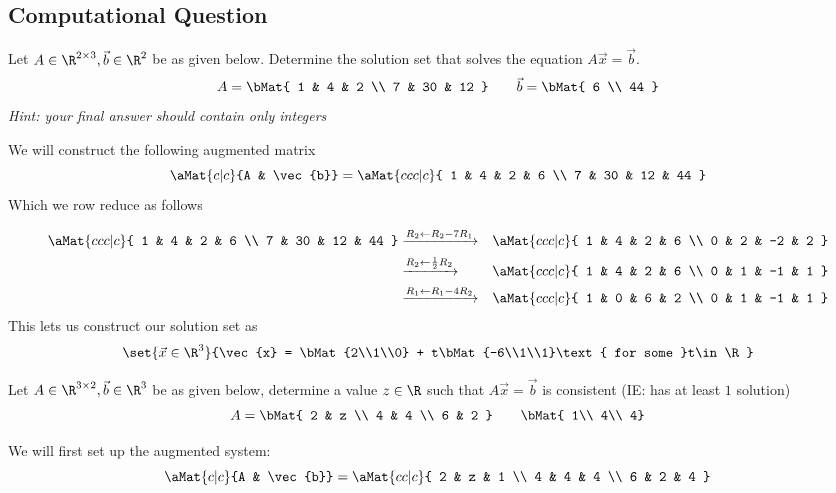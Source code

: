 \documentclass[12pt,addpoints,answers]{exam}
\begin{document}
\begin{questions}
    \section*{Computational Question}
    \question[15]
    Let $A\in\R^{2\times 3},\vec{b}\in\R^2$ be as given below. Determine the solution set that
    solves the equation $A\vec{x} = \vec{b}$.
    \[
        A = \bMat{
        1 & 4 & 2 \\
        7 & 30 & 12
        } \qquad \vec{b} = \bMat{ 6 \\ 44 }
    \]
    \emph{Hint: your final answer should contain only integers}
    \begin{solution}
        We will construct the following augmented matrix
        \[
            \aMat{c|c}{A & \vec{b}} = \aMat{ccc|c}{
                1 & 4 & 2 & 6 \\
                7 & 30 & 12 & 44
            }
        \]
        Which we row reduce as follows

        \begin{eqnarray*}
            \aMat{ccc|c}{
                1 & 4 & 2 & 6 \\
                7 & 30 & 12 & 44
            } &\xrightarrow{R_2\gets R_2 - 7R_1}&\aMat{ccc|c}{
                1 & 4 & 2 & 6 \\
                0 & 2 & -2 & 2
            } \\
            &\xrightarrow{R_2\gets \frac{1}{2}R_2}&\aMat{ccc|c}{
                1 & 4 & 2 & 6 \\
                0 & 1 & -1 & 1
            }\\
            &\xrightarrow{R_1\gets R_1 - 4R_2}&\aMat{ccc|c}{
                1 & 0 & 6 & 2 \\
                0 & 1 & -1 & 1
            }
        \end{eqnarray*}
        This lets us construct our solution set as
        \[
            \set{\vec{x}\in\R^{3}}{\vec{x} = \bMat{2\\1\\0} + t\bMat{-6\\1\\1}\text{ for some }t\in\R}
        \]
    \end{solution}
    \newpage
    \question[20]
    Let $A\in\R^{3\times 2}, \vec{b}\in\R^{3}$ be as given below, determine a value $z\in\R$
    such that $A\vec{x} = \vec{b}$ is consistent (IE: has at least $1$ solution)
    \[
        A = \bMat{
        2 & z \\
        4 & 4 \\
        6 & 2
        }\qquad \bMat{ 1\\ 4\\ 4}
    \]
    \begin{solution}
        We will first set up the augmented system:
        \[\aMat{c|c}{A & \vec{b}} = \aMat{cc|c}{
            2 & z & 1 \\
            4 & 4 & 4 \\
            6 & 2 & 4
        }\]


\end{solution}
\end{questions}
\end{document}
